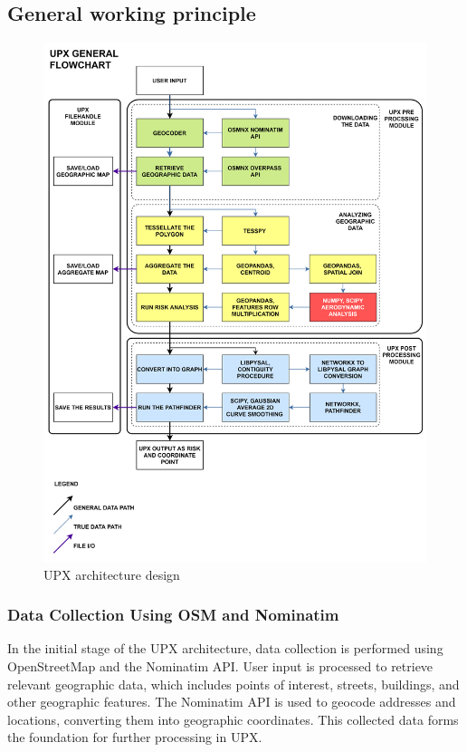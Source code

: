 \documentclass[12pt]{report}
\begin{document}
    \subsection{General working principle}
        \begin{figure}[H]
            \centering
            \includegraphics[width=\textwidth]{General Image/UPX GENERAL FLOWCHART.png}
            \caption{UPX architecture design}
            \label{fig:UPX_arch}
        \end{figure}

        \subsubsection{Data Collection Using OSM and Nominatim}
        In the initial stage of the UPX architecture, data collection is performed using OpenStreetMap and the Nominatim
        API. User input is processed to retrieve relevant geographic data, which includes points of interest, streets,
        buildings, and other geographic features. The Nominatim API is used to geocode addresses and locations,
        converting them into geographic coordinates. This collected data forms the foundation for further processing in
        UPX.
            
\end{document}
